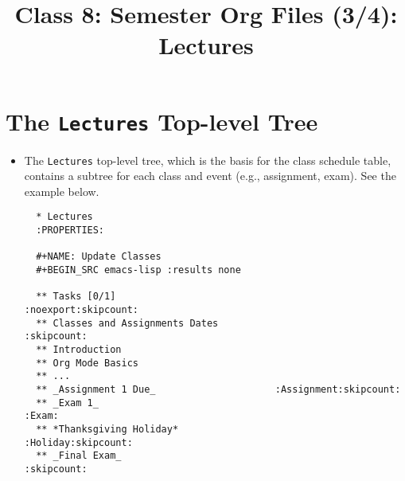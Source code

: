 \documentclass[10pt,article]{article}
\date{\vspace{-6ex}}
\title{Class 8: Semester Org Files (3/4): Lectures}
\begin{document}
\maketitle
{} 
\thispagestyle{fancy}

\setcounter{tocdepth}{1}
\tableofcontents
\vspace{6ex}

\section{The \texttt{Lectures} Top-level Tree}
\label{sec:orgdb3c315}
\begin{itemize}
\item The \texttt{Lectures} top-level tree, which is the basis for the class
schedule table, contains a subtree for each class and event (e.g.,
assignment, exam). See the example below.

{\small
\begin{verbatim}
  * Lectures
  :PROPERTIES:
  
  #+NAME: Update Classes
  #+BEGIN_SRC emacs-lisp :results none
  
  ** Tasks [0/1]                                           :noexport:skipcount:
  ** Classes and Assignments Dates                                  :skipcount:
  ** Introduction
  ** Org Mode Basics
  ** ...
  ** _Assignment 1 Due_                     :Assignment:skipcount:
  ** _Exam 1_                                                           :Exam:
  ** *Thanksgiving Holiday*                                 :Holiday:skipcount:
  ** _Final Exam_                                                   :skipcount:
\end{verbatim}
}
\end{itemize}
\end{document}
